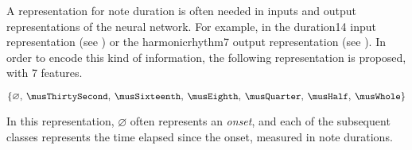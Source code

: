 
A representation for note duration is often needed in inputs
and output representations of the neural network. For
example, in the \gls{duration14} input representation (see
) or the \gls{harmonicrhythm7} output
representation (see ). In
order to encode this kind of information, the following
representation is proposed, with 7 features.

\begin{equation}
    \{\varnothing,\: \musThirtySecond,\: \musSixteenth,\: \musEighth,\: 
    \musQuarter,\: \musHalf,\: \musWhole \}
\end{equation}

In this representation, $\varnothing$ often represents an
\emph{onset}, and each of the subsequent classes represents
the time elapsed since the onset, measured in note
durations.
